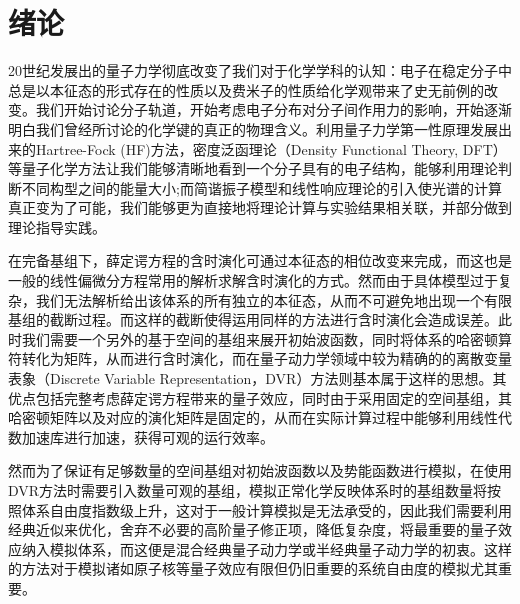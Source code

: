 
\section{绪论}


20世纪发展出的量子力学彻底改变了我们对于化学学科的认知：电子在稳定分子中总是以本征态的形式存在的性质以及费米子的性质给化学观带来了史无前例的改变。我们开始讨论分子轨道，开始考虑电子分布对分子间作用力的影响，开始逐渐明白我们曾经所讨论的化学键的真正的物理含义。利用量子力学第一性原理发展出来的Hartree-Fock (HF)方法，密度泛函理论（Density Functional Theory, DFT）等量子化学方法让我们能够清晰地看到一个分子具有的电子结构，能够利用理论判断不同构型之间的能量大小;而简谐振子模型和线性响应理论的引入使光谱的计算真正变为了可能，我们能够更为直接地将理论计算与实验结果相关联，并部分做到理论指导实践。

在完备基组下，薛定谔方程的含时演化可通过本征态的相位改变来完成，而这也是一般的线性偏微分方程常用的解析求解含时演化的方式\cite{courant2008methods}。然而由于具体模型过于复杂，我们无法解析给出该体系的所有独立的本征态，从而不可避免地出现一个有限基组的截断过程。而这样的截断使得运用同样的方法进行含时演化会造成误差。此时我们需要一个另外的基于空间的基组来展开初始波函数，同时将体系的哈密顿算符转化为矩阵，从而进行含时演化，而在量子动力学领域中较为精确的的离散变量表象（Discrete Variable Representation，DVR）方法则基本属于这样的思想\cite{colbert1992novel}。其优点包括完整考虑薛定谔方程带来的量子效应，同时由于采用固定的空间基组，其哈密顿矩阵以及对应的演化矩阵是固定的，从而在实际计算过程中能够利用线性代数加速库进行加速，获得可观的运行效率。

然而为了保证有足够数量的空间基组对初始波函数以及势能函数进行模拟，在使用DVR方法时需要引入数量可观的基组，模拟正常化学反映体系时的基组数量将按照体系自由度指数级上升，这对于一般计算模拟是无法承受的，因此我们需要利用经典近似来优化，舍弃不必要的高阶量子修正项，降低复杂度，将最重要的量子效应纳入模拟体系，而这便是混合经典量子动力学或半经典量子动力学的初衷。这样的方法对于模拟诸如原子核等量子效应有限但仍旧重要的系统自由度的模拟尤其重要。

